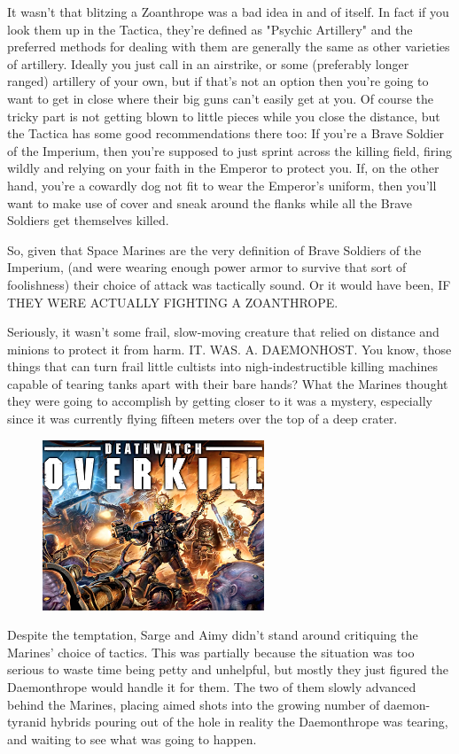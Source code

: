 It wasn't that blitzing a Zoanthrope was a bad idea in and of itself. 
In fact if you look them up in the Tactica, they're defined as "Psychic Artillery" and the preferred methods for dealing with them are generally the same as other varieties of artillery. 
Ideally you just call in an airstrike, or some (preferably longer ranged) artillery of your own, but if that's not an option then you're going to want to get in close where their big guns can't easily get at you. 
Of course the tricky part is not getting blown to little pieces while you close the distance, but the Tactica has some good recommendations there too: 
If you're a Brave Soldier of the Imperium, then you're supposed to just sprint across the killing field, firing wildly and relying on your faith in the Emperor to protect you. 
If, on the other hand, you're a cowardly dog not fit to wear the Emperor's uniform, then you'll want to make use of cover and sneak around the flanks while all the Brave Soldiers get themselves killed.

So, given that Space Marines are the very definition of Brave Soldiers of the Imperium, (and were wearing enough power armor to survive that sort of foolishness) their choice of attack was tactically sound. 
Or it would have been, IF THEY WERE ACTUALLY FIGHTING A ZOANTHROPE.

Seriously, it wasn't some frail, slow-moving creature that relied on distance and minions to protect it from harm. 
IT. 
WAS. 
A. 
DAEMONHOST. 
You know, those things that can turn frail little cultists into nigh-indestructible killing machines capable of tearing tanks apart with their bare hands? 
What the Marines thought they were going to accomplish by getting closer to it was a mystery, especially since it was currently flying fifteen meters over the top of a deep crater.

\begin{figure}
	\begin{center}
		\includegraphics[width=\figwidth]{pics/16/45.png}
	\end{center}
\end{figure}
Despite the temptation, Sarge and Aimy didn't stand around critiquing the Marines' choice of tactics. 
This was partially because the situation was too serious to waste time being petty and unhelpful, but mostly they just figured the Daemonthrope would handle it for them. 
The two of them slowly advanced behind the Marines, placing aimed shots into the growing number of daemon-tyranid hybrids pouring out of the hole in reality the Daemonthrope was tearing, and waiting to see what was going to happen.


